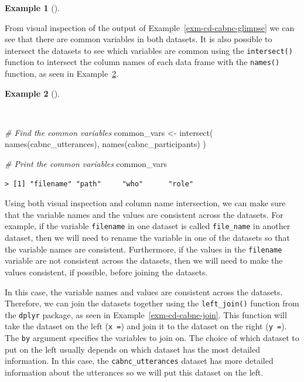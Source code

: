 \documentclass[
  letterpaper,
  DIV=11,
  numbers=noendperiod]{scrreport}
\newenvironment{Shaded}{\begin{snugshade}}{\end{snugshade}}
\newcommand{\CommentTok}[1]{\textcolor[rgb]{0.00,0.00,0.00}{\textit{#1}}}
\newcommand{\FunctionTok}[1]{\textcolor[rgb]{0.00,0.00,0.00}{#1}}
\newcommand{\NormalTok}[1]{\textcolor[rgb]{0.00,0.00,0.00}{#1}}
\newcommand{\OtherTok}[1]{\textcolor[rgb]{0.00,0.00,0.00}{#1}}
\theoremstyle{definition}
\newtheorem{example}{Example}[chapter]
\theoremstyle{remark}
\begin{document}
\begin{example}[]
\end{example}

From visual inspection of the output of
Example~\ref{exm-cd-cabnc-glimpse} we can see that there are common
variables in both datasets. It is also possible to intersect the
datasets to see which variables are common using the
\texttt{intersect()} function to intersect the column names of each data
frame with the \texttt{names()} function, as seen in
Example~\ref{exm-cd-cabnc-intersect}.

\begin{example}[]\protect\hypertarget{exm-cd-cabnc-intersect}{}\label{exm-cd-cabnc-intersect}

~

\begin{Shaded}
\begin{Highlighting}[]
\CommentTok{\# Find the common variables}
\NormalTok{common\_vars }\OtherTok{\textless{}{-}} 
  \FunctionTok{intersect}\NormalTok{(}
    \FunctionTok{names}\NormalTok{(cabnc\_utterances), }
    \FunctionTok{names}\NormalTok{(cabnc\_participants)}
\NormalTok{  )}

\CommentTok{\# Print the common variables}
\NormalTok{common\_vars}
\end{Highlighting}
\end{Shaded}

\begin{verbatim}
> [1] "filename" "path"     "who"      "role"
\end{verbatim}

\end{example}

Using both visual inspection and column name intersection, we can make
sure that the variable names and the values are consistent across the
datasets. For example, if the variable \texttt{filename} in one dataset
is called \texttt{file\_name} in another dataset, then we will need to
rename the variable in one of the datasets so that the variable names
are consistent. Furthermore, if the values in the \texttt{filename}
variable are not consistent across the datasets, then we will need to
make the values consistent, if possible, before joining the datasets.

In this case, the variable names and values are consistent across the
datasets. Therefore, we can join the datasets together using the
\texttt{left\_join()} function from the \texttt{dplyr} package, as seen
in Example~\ref{exm-cd-cabnc-join}. This function will take the dataset
on the left (\texttt{x\ =}) and join it to the dataset on the right
(\texttt{y\ =}). The \texttt{by} argument specifies the variables to
join on. The choice of which dataset to put on the left usually depends
on which dataset has the most detailed information. In this case, the
\texttt{cabnc\_utterances} dataset has more detailed information about
the utterances so we will put this dataset on the left.
\end{document}
